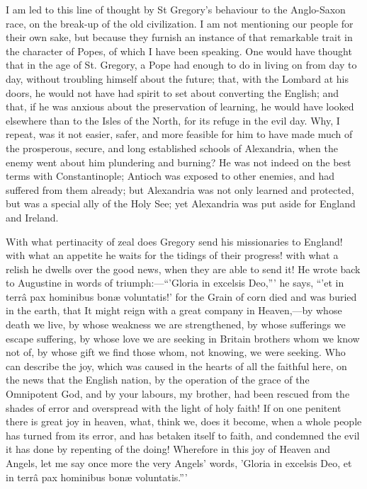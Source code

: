I am led to this line of thought by St Gregory's behaviour to the
Anglo-Saxon race, on the break-up of the old civilization. I am not
mentioning our people for their own sake, but because they furnish an
instance of that remarkable trait in the character of Popes, of which
I have been speaking. One would have thought that in the age of St.
Gregory, a Pope had enough to do in living on from day to day,
without troubling himself about the future; that, with the Lombard at
his doors, he would not have had spirit to set about converting the
English; and that, if he was anxious about the preservation of
learning, he would have looked elsewhere than to the Isles of the
North, for its refuge in the evil day. Why, I repeat, was it not
easier, safer, and more feasible for him to have made much of the
prosperous, secure, and long established schools of Alexandria, when
the enemy went about him plundering and burning? He was not indeed on
the best terms with Constantinople; Antioch was exposed to other
enemies, and had suffered from them already; but Alexandria was not
only learned and protected, but was a special ally of the Holy See;
yet Alexandria was put aside for England and Ireland.

With what pertinacity of zeal does Gregory send his missionaries to
England! with what an appetite he waits for the tidings of their
progress! with what a relish he dwells over the good news, when they
are able to send it! He wrote back to Augustine in words of triumph:—``'Gloria
in excelsis Deo,''' he says, ``'et in terrâ pax hominibus
bonæ voluntatis!' for the Grain of corn died and was buried in the
earth, that It might reign with a great company in Heaven,—by whose
death we live, by whose weakness we are strengthened, by whose
sufferings we escape suffering, by whose love we are seeking in
Britain brothers whom we know not of, by whose gift we find those
whom, not knowing, we were seeking. Who can describe the joy, which
was caused in the hearts of all the faithful here, on the news that
the English nation, by the operation of the grace of the Omnipotent
God, and by your labours, my brother, had been rescued from the shades
of error and overspread with the light of holy faith! If on one
penitent there is great joy in heaven, what, think we, does it become,
when a whole people has turned from its error, and has betaken itself
to faith, and condemned the evil it has done by repenting of the
doing! Wherefore in this joy of Heaven and Angels, let me say once
more the very Angels' words, 'Gloria in excelsis Deo, et in terrâ pax
hominibus bonæ voluntatis.'''


